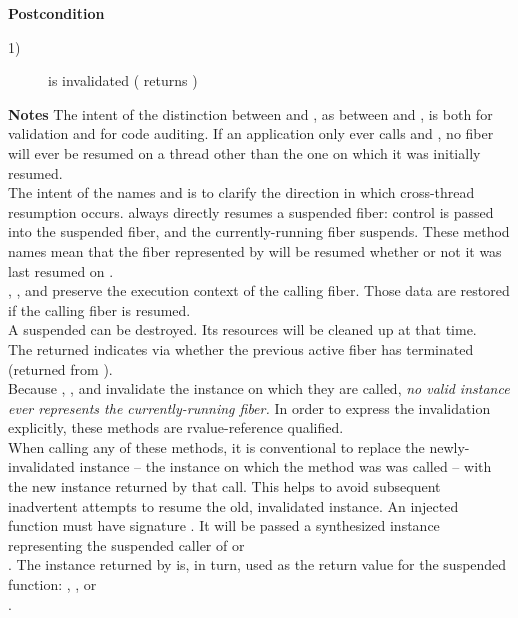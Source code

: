 {\bfseries Postcondition}
\begin{description}
    \item[1)]  is invalidated ( returns )
\end{description}

{\bfseries Notes}
\newline
The intent of the distinction between \resume and \xtresume, as
between \resumewith and \xtresumewith, is both for validation and for code
auditing. If an application only ever calls \resume and \resumewith, no fiber
will ever be resumed on a thread other than the one on which it was initially
resumed.\\

The intent of the names \xtresume and \xtresumewith is to clarify the
direction in which cross-thread resumption occurs. \Currthread always
directly resumes a suspended fiber: control is passed into the suspended
fiber, and the currently-running fiber suspends. These method names mean that
the fiber represented by  will be resumed whether or not it was
last resumed on \currthread.\\

\resume, \resumewith, \xtresume and \xtresumewith preserve the execution
context of the calling fiber. Those data are restored if the calling fiber is
resumed.\\
A suspended  can be destroyed. Its resources will be cleaned
up at that time.\\
The returned  indicates via  whether the previous active
fiber has terminated (returned from \entryfn).\\
Because \resume, \resumewith, \xtresume and \xtresumewith invalidate the
instance on which they are called, \emph{no valid \fiber instance ever
represents the currently-running fiber.} In order to express the invalidation
explicitly, these methods are rvalue-reference qualified.\\
When calling any of these methods, it is conventional to replace the
newly-invalidated instance -- the instance on which the method was was called
-- with the new instance returned by that call. This helps to avoid subsequent
inadvertent attempts to resume the old, invalidated instance.
\newline
An injected function  must have signature
.
It will be passed a synthesized \fiber instance representing
the suspended caller of \resumewith or\\
\xtresumewith. The \fiber instance returned by  is, in turn, used as
the return value for the suspended function: \resume, \resumewith, \xtresume
or\\\xtresumewith.


